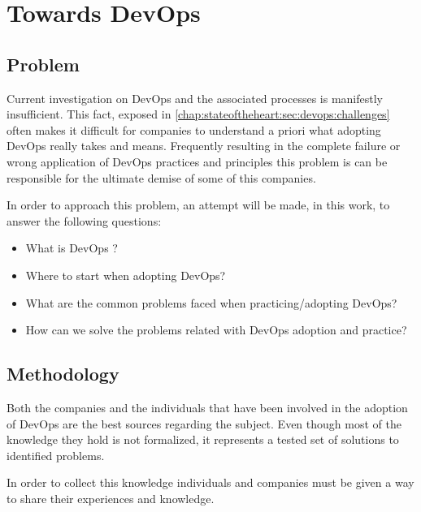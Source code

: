 \chapter{Towards DevOps} \label{chap:towardsdevops}

        \section{Problem} \label{chap:towardsdevops:sec:problem}

        Current investigation on DevOps and the associated processes is manifestly insufficient. This fact, exposed in \ref{chap:stateoftheheart:sec:devops:challenges} often makes it difficult for companies to understand a priori what adopting DevOps really takes and means. Frequently resulting in the complete failure or wrong application of DevOps practices and principles this problem is can be responsible for the ultimate demise of some of this companies.

        In order to approach this problem, an attempt will be made, in this work, to answer the following questions: 

        \begin{itemize}
            \item{What is DevOps ?}
            \item{Where to start when adopting DevOps?}
            \item{What are the common problems faced when practicing/adopting DevOps?}
            \item{How can we solve the problems related with DevOps adoption and practice?}
        \end{itemize}


       
        \section{Methodology} \label{chap:towardsdevops:sec:methodology}
        
        Both the companies and the individuals that have been involved in the  adoption of DevOps are the best sources regarding the subject. Even though most of the knowledge they hold is not formalized, it represents a tested  set of solutions to identified problems.
        
        In order to collect this knowledge individuals and companies must be given a way to share their experiences and knowledge. 
        
